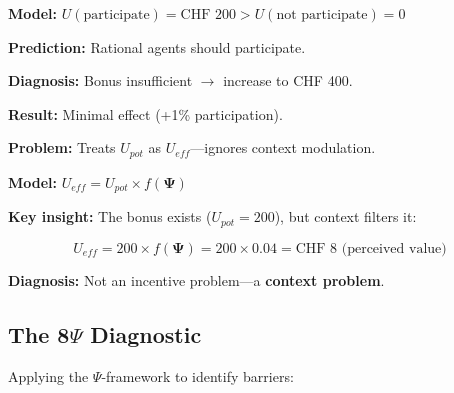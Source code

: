 \begin{tcolorbox}[colback=red!5!white, colframe=red!75!black,
    title=\textbf{Standard Economic Analysis (Incorrect)}]

\textbf{Model:} $U(\text{participate}) = \text{CHF } 200 > U(\text{not participate}) = 0$

\textbf{Prediction:} Rational agents should participate.

\textbf{Diagnosis:} Bonus insufficient $\rightarrow$ increase to CHF 400.

\textbf{Result:} Minimal effect (+1\% participation).

\textbf{Problem:} Treats $U_{pot}$ as $U_{eff}$---ignores context modulation.

\end{tcolorbox}

\begin{tcolorbox}[colback=green!5!white, colframe=green!75!black,
    title=\textbf{$\Psi$-Framework Analysis (Correct)}]

\textbf{Model:} $U_{eff} = U_{pot} \times f(\boldsymbol{\Psi})$

\textbf{Key insight:} The bonus exists ($U_{pot} = 200$), but context filters it:

\[
U_{eff} = 200 \times f(\boldsymbol{\Psi}) = 200 \times 0.04 = \text{CHF } 8 \text{ (perceived value)}
\]

\textbf{Diagnosis:} Not an incentive problem---a \textbf{context problem}.

\end{tcolorbox}

\subsection{The 8$\Psi$ Diagnostic}

Applying the $\Psi$-framework to identify barriers:

